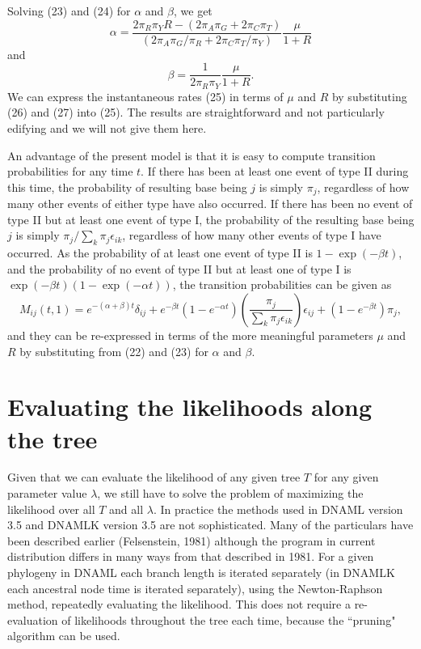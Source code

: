 \documentclass[12pt]{article}
\begin{document}
Solving (23) and (24) for $\alpha$ and $\beta$, we get
\begin{equation}%
\alpha  =  \frac{2\pi_R\pi_Y R - (2\pi_A\pi_G+2\pi_C\pi_T)}{(2\pi_A\pi_G/\pi_R+2\pi_C\pi_T/\pi_Y)}\frac{\mu}{1+R}
\end{equation}
and
\begin{equation}%
\beta  =  \frac{1}{2\pi_R\pi_Y}\frac{\mu}{1+R}.
\end{equation}
We can express the instantaneous rates (25) in terms of $\mu$ and $R$
by substituting (26) and (27) into (25).  The results are straightforward and
not particularly edifying and we will not give them here.

An advantage of the present model is that it is easy to compute transition
probabilities for any time $t$.  If there has been at least one event of type
II during this time, the probability of resulting base being $j$ is simply
$\pi_j$, regardless of how many other events of either type have also
occurred.  If there has been no event of type II but at least one event of
type I, the probability of the resulting base being $j$ is simply $\pi_j/\sum_k \pi_j \epsilon _{ik}$, regardless of how many other events of type I have
occurred.  As the probability of at least one event of type II is $1-\exp(-\beta t)$, and the probability of no event of type II but at least one of type I
is $\exp(-\beta t) (1-\exp(-\alpha t))$, the transition probabilities can be
given as
\begin{equation}%
M_{ij}(t, 1) = e^{-(\alpha+\beta)t} \delta_{ij} + e^{-\beta t} \left(1-e^{-\alpha t}\right)\left(\frac{\pi_j}{\sum_k
\pi_j \epsilon _{ik}}\right) \epsilon_{ij} + \left(1-e^{-\beta t}\right) \pi_j,
\end{equation}
and they can be re-expressed in terms of the more meaningful parameters $\mu$
and $R$ by substituting from (22) and (23) for $\alpha$ and $\beta$.


\section*{Evaluating the likelihoods along the tree}

Given that we can evaluate the likelihood of any given tree $T$ for any
given parameter value $\lambda$, we still have to solve the problem of
maximizing the likelihood over all $T$ and all $\lambda$.  In practice the
methods used in DNAML version 3.5 and DNAMLK version 3.5 are not sophisticated.
Many of the particulars have been described earlier (Felsenstein, 1981)
although the program in current distribution differs in many ways from that
described in 1981.  For a given phylogeny in DNAML each branch length is
iterated separately
(in DNAMLK each ancestral node time is iterated separately), using
the Newton-Raphson method, repeatedly evaluating the likelihood.  This does
not require a re-evaluation of likelihoods throughout the tree each time,
because the ``pruning" algorithm can be used.
\end{document}
